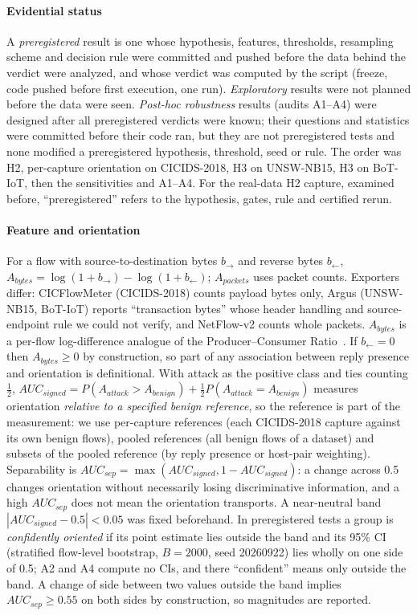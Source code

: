 \documentclass[preprint,12pt]{elsarticle}
\begin{document}
\paragraph{Evidential status} A \emph{preregistered} result is one whose hypothesis, features, thresholds, resampling scheme and decision rule were committed and pushed before the data behind the verdict were analyzed, and whose verdict was computed by the script (freeze, code pushed before first execution, one run). \emph{Exploratory} results were not planned before the data were seen. \emph{Post-hoc robustness} results (audits A1--A4) were designed after all preregistered verdicts were known; their questions and statistics were committed before their code ran, but they are not preregistered tests and none modified a preregistered hypothesis, threshold, seed or rule. The order was H2, per-capture orientation on CICIDS-2018, H3 on UNSW-NB15, H3 on BoT-IoT, then the sensitivities and A1--A4. For the real-data H2 capture, examined before, ``preregistered'' refers to the hypothesis, gates, rule and certified rerun.

\paragraph{Feature and orientation} For a flow with source-to-destination bytes $b_{\rightarrow}$ and reverse bytes $b_{\leftarrow}$, $A_{bytes}=\log(1+b_{\rightarrow})-\log(1+b_{\leftarrow})$; $A_{packets}$ uses packet counts. Exporters differ: CICFlowMeter (CICIDS-2018) counts payload bytes only, Argus (UNSW-NB15, BoT-IoT) reports ``transaction bytes'' whose header handling and source-endpoint rule we could not verify, and NetFlow-v2 counts whole packets. $A_{bytes}$ is a per-flow log-difference analogue of the Producer--Consumer Ratio~\cite{bullard2014pcr}. If $b_{\leftarrow}=0$ then $A_{bytes}\ge0$ by construction, so part of any association between reply presence and orientation is definitional. With attack as the positive class and ties counting $\tfrac12$, $AUC_{signed}=P(A_{attack}>A_{benign})+\tfrac12P(A_{attack}=A_{benign})$ measures orientation \emph{relative to a specified benign reference}, so the reference is part of the measurement: we use per-capture references (each CICIDS-2018 capture against its own benign flows), pooled references (all benign flows of a dataset) and subsets of the pooled reference (by reply presence or host-pair weighting). Separability is $AUC_{sep}=\max(AUC_{signed},1-AUC_{signed})$: a change across 0.5 changes orientation without necessarily losing discriminative information, and a high $AUC_{sep}$ does not mean the orientation transports. A near-neutral band $|AUC_{signed}-0.5|<0.05$ was fixed beforehand. In preregistered tests a group is \emph{confidently oriented} if its point estimate lies outside the band and its 95\% CI (stratified flow-level bootstrap, $B=2000$, seed 20260922) lies wholly on one side of 0.5; A2 and A4 compute no CIs, and there ``confident'' means only outside the band. A change of side between two values outside the band implies $AUC_{sep}\ge0.55$ on both sides by construction, so magnitudes are reported.
\end{document}
